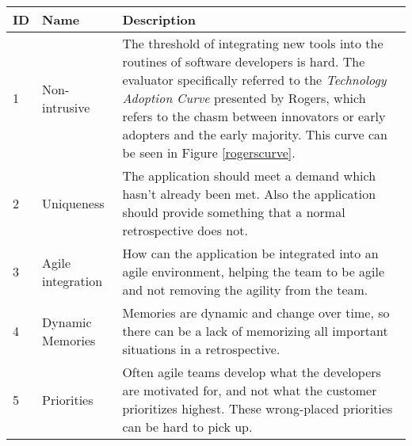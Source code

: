 \begin{table}[H]
    \begin{tabularx}{\textwidth}{|l|l|X|}
    \hline
    ID & Name                & Description                                                                                                                                                                                                                                                                                                                                                    \\ \hline
    1  & Non-intrusive       & The threshold of integrating new tools into the routines of software developers is hard. The evaluator specifically referred to the \emph{Technology Adoption Curve} presented by Rogers\cite{rogers2010diffusion}, which refers to the chasm between innovators or early adopters and the early majority. This curve can be seen in Figure \ref{rogerscurve}. \\ \hline
    2  & Uniqueness          & The application should meet a demand which hasn't already been met. Also the application should provide something that a normal retrospective does not.                                                                                                                                                                                                        \\ \hline
    3  & Agile integration   & How can the application be integrated into an agile environment, helping the team to be agile and not removing the agility from the team.                                                                                                                                                                                                                      \\ \hline
    4  & Dynamic Memories    & Memories are dynamic and change over time, so there can be a lack of memorizing all important situations in a retrospective.                                                                                                                                                                                                                                   \\ \hline
    5  & Priorities          & Often agile teams develop what the developers are motivated for, and not what the customer prioritizes highest. These wrong-placed priorities can be hard to pick up.                                                                                                                                                                                          \\ \hline

\end{tabularx}
\end{table}
